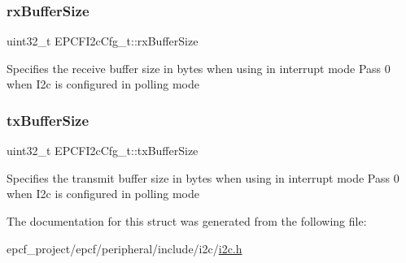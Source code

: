 \subsubsection{\texorpdfstring{rx\+Buffer\+Size}{rxBufferSize}}
{\footnotesize\ttfamily uint32\+\_\+t E\+P\+C\+F\+I2c\+Cfg\+\_\+t\+::rx\+Buffer\+Size}

Specifies the receive buffer size in bytes when using in interrupt mode Pass 0 when I2c is configured in polling mode \mbox{\label{structEPCFI2cCfg__t_adea9d88eb9ceea68e9d8f80751f8323b}} 
\subsubsection{\texorpdfstring{tx\+Buffer\+Size}{txBufferSize}}
{\footnotesize\ttfamily uint32\+\_\+t E\+P\+C\+F\+I2c\+Cfg\+\_\+t\+::tx\+Buffer\+Size}

Specifies the transmit buffer size in bytes when using in interrupt mode Pass 0 when I2c is configured in polling mode 

The documentation for this struct was generated from the following file\+:\begin{DoxyCompactItemize}
\item 
epcf\+\_\+project/epcf/peripheral/include/i2c/\mbox{\hyperlink{i2c_8h}{i2c.\+h}}\end{DoxyCompactItemize}
